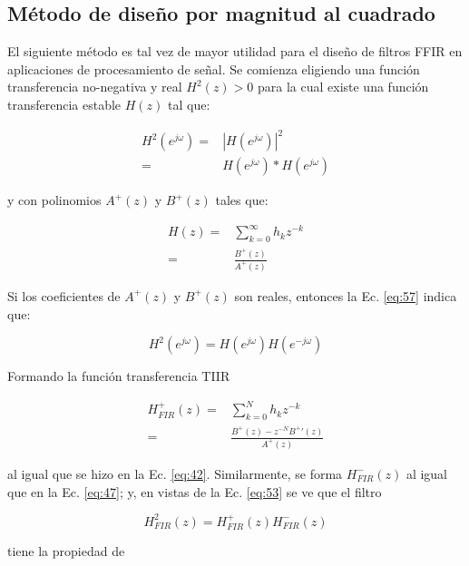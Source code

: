 \subsection{Método de diseño por magnitud al cuadrado}\label{sec:02-02-mag-cuad}
    El siguiente método es tal vez de mayor utilidad para el diseño de filtros FFIR en aplicaciones de procesamiento de señal. Se comienza eligiendo una función transferencia no-negativa y real $H^2(z)>0$ para la cual existe una función transferencia estable $H(z)$ tal que:

    \begin{align}
      H^2 \left( e^{j\omega} \right) =& |H \left( e^{j\omega} \right)|^2\\
      =& H \left( e^{j\omega} \right) * H \left( e^{j\omega} \right)
         \label{eq:57}
    \end{align}

    y con polinomios $A^{ + }(z)$ y $B^{ + }(z)$ tales que:

    \begin{align}
      H(z) =& \sum_{k=0}^{\infty}{h_k z^{-k}}\\
      =& \frac{B^{ + }(z)}{A^{ + }(z)}
    \end{align}

    Si los coeficientes de $A^{ + }(z)$ y $B^{ + }(z)$ son reales, entonces la Ec. \ref{eq:57} indica que:

    \begin{equation}
      H^2 \left( e^{j\omega} \right) = H \left( e^{j\omega} \right) H \left( e^{-j\omega} \right)
    \end{equation}

    Formando la función transferencia TIIR

    \begin{align}
      H_{FIR}^{+}(z) =& \sum_{k=0}^{N}{h_k z^{-k}} \\
      =& \frac{B^{+}(z) - z^{-N} B^{+}\prime (z)}{A^{ + }(z)}
         \label{eq:60}
    \end{align}

    al igual que se hizo en la Ec. \ref{eq:42}. Similarmente, se forma $H_{FIR}^{-}(z)$ al igual que en la Ec. \ref{eq:47}; y, en vistas de la Ec. \ref{eq:53} se ve que el filtro

    \begin{equation}
      H^2_{FIR}(z) = H_{FIR}^{ + }(z) H_{FIR}^{ - }(z)
    \end{equation}

    tiene la propiedad de

